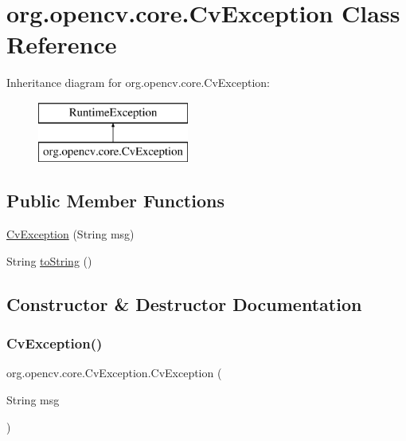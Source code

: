 \hypertarget{classorg_1_1opencv_1_1core_1_1_cv_exception}{}\section{org.\+opencv.\+core.\+Cv\+Exception Class Reference}
\label{classorg_1_1opencv_1_1core_1_1_cv_exception}
Inheritance diagram for org.\+opencv.\+core.\+Cv\+Exception\+:\begin{figure}[H]
\begin{center}
\leavevmode
\includegraphics[height=2.000000cm]{classorg_1_1opencv_1_1core_1_1_cv_exception}
\end{center}
\end{figure}
\subsection*{Public Member Functions}
\begin{DoxyCompactItemize}
\item 
\mbox{\hyperlink{classorg_1_1opencv_1_1core_1_1_cv_exception_acb6ec9f932b1e4597530a9c2909faf66}{Cv\+Exception}} (String msg)
\item 
String \mbox{\hyperlink{classorg_1_1opencv_1_1core_1_1_cv_exception_a62e6bc507d9605178a834087a03438d6}{to\+String}} ()
\end{DoxyCompactItemize}


\subsection{Constructor \& Destructor Documentation}
\mbox{\label{classorg_1_1opencv_1_1core_1_1_cv_exception_acb6ec9f932b1e4597530a9c2909faf66}} 
\subsubsection{\texorpdfstring{Cv\+Exception()}{CvException()}}
{\footnotesize\ttfamily org.\+opencv.\+core.\+Cv\+Exception.\+Cv\+Exception (\begin{DoxyParamCaption}\item[{String}]{msg }\end{DoxyParamCaption})}



